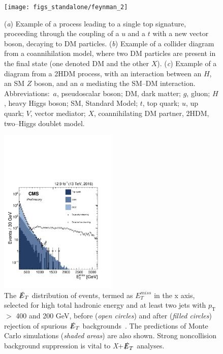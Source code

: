 \documentclass{ar-1col}
\newcommand{\pt}{\ensuremath{p_\mathrm{T}}\xspace}
\newcommand{\MET}{\ensuremath{\slashed{E}_T}\xspace}
\begin{document}
\clearpage

\begin{figure}[!htpb]
\texttt{[image: figs\_standalone/feynman\_2]}
\caption{
(\textit{a}) Example of a process leading to a single top signature, proceeding through the coupling of a $u$ and a $t$ with a new vector boson, decaying to DM particles. 
(\textit{b}) Example of a collider diagram from a coannihilation model, where two DM particles are present in the final state (one denoted DM and the other  $X$). 
(\textit{c}) Example of a diagram from a 2HDM process, with an interaction between an  $H$, an SM $Z$ boson, and an $a$ mediating the SM--DM interaction. 
Abbreviations:\ $a$, pseudoscalar boson; DM, dark matter; $g$, gluon; $H$, heavy Higgs boson; SM, Standard Model; $t$, top quark;  $u$, up quark; $V$, vector mediator; $X$, coannihilating DM partner, 2HDM, two--Higgs doublet model.}
\label{fig:feynman_2}
\end{figure}

\clearpage

\begin{figure}[!htpb]
\includegraphics[width=0.5\textwidth]{figs_standalone/FakeMET}
\caption{The \MET distribution of events, termed as $E_T^{miss}$ in the x axis, selected for high total
hadronic energy and at least two jets with \pt{} $>$ 400 and 200
GeV, before (\textit{open circles}) and after (\textit{filled circles}) rejection of
spurious \MET backgrounds~\cite{CMS-PAS-JME-16-004}. The
predictions of Monte Carlo  simulations (\textit{shaded areas}) are also shown. Strong
noncollision background suppression is vital to \textit{X}+\MET analyses.}
\label{fig:fakeMET}
\end{figure}
\end{document}
